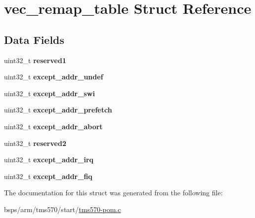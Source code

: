 \hypertarget{structvec__remap__table}{}\section{vec\+\_\+remap\+\_\+table Struct Reference}
\label{structvec__remap__table}
\subsection*{Data Fields}
\begin{DoxyCompactItemize}
\item 
\mbox{\label{structvec__remap__table_abb4e049eea84a76e54083b2abb9e6dd9}} 
uint32\+\_\+t {\bfseries reserved1}
\item 
\mbox{\label{structvec__remap__table_ad4ececff52dac3bdbc98b48ecabc5bc1}} 
uint32\+\_\+t {\bfseries except\+\_\+addr\+\_\+undef}
\item 
\mbox{\label{structvec__remap__table_a834aaa8567397b864e8158c4d6e7eb59}} 
uint32\+\_\+t {\bfseries except\+\_\+addr\+\_\+swi}
\item 
\mbox{\label{structvec__remap__table_af192c8d65bad4414e24f83b5baa4a380}} 
uint32\+\_\+t {\bfseries except\+\_\+addr\+\_\+prefetch}
\item 
\mbox{\label{structvec__remap__table_a0247cbd8f527b174487a1202584d5f68}} 
uint32\+\_\+t {\bfseries except\+\_\+addr\+\_\+abort}
\item 
\mbox{\label{structvec__remap__table_a4d90a2b07328b3a77a6e4155ea1336f8}} 
uint32\+\_\+t {\bfseries reserved2}
\item 
\mbox{\label{structvec__remap__table_a96364d5af389a96c6863c397b3250538}} 
uint32\+\_\+t {\bfseries except\+\_\+addr\+\_\+irq}
\item 
\mbox{\label{structvec__remap__table_abc9ee7330cf49718c51aa7885866bb63}} 
uint32\+\_\+t {\bfseries except\+\_\+addr\+\_\+fiq}
\end{DoxyCompactItemize}


The documentation for this struct was generated from the following file\+:\begin{DoxyCompactItemize}
\item 
bsps/arm/tms570/start/\mbox{\hyperlink{tms570-pom_8c}{tms570-\/pom.\+c}}\end{DoxyCompactItemize}

